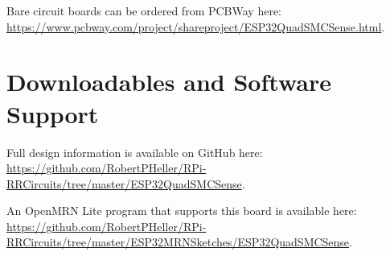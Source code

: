 Bare circuit boards can be ordered from PCBWay here: 
\url{https://www.pcbway.com/project/shareproject/ESP32QuadSMCSense.html}.

\section{Downloadables and Software Support}

Full design information is available on GitHub here:
\url{https://github.com/RobertPHeller/RPi-RRCircuits/tree/master/ESP32QuadSMCSense}.

An OpenMRN Lite program that supports this board is available here:
\url{https://github.com/RobertPHeller/RPi-RRCircuits/tree/master/ESP32MRNSketches/ESP32QuadSMCSense}.




